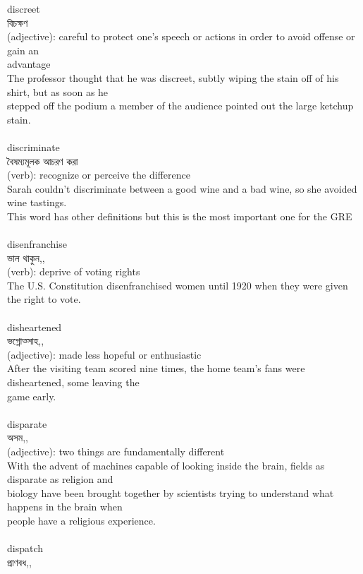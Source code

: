 \documentclass{article}
\begin{document}
{discreet}\\
{বিচক্ষণ}\\
{(adjective): careful to protect one's speech or actions in order to avoid offense or gain an\\advantage\\The professor thought that he was discreet, subtly wiping the stain off of his shirt, but as soon as he\\stepped off the podium a member of the audience pointed out the large ketchup stain.\\}\\
{discriminate}\\
{বৈষম্যমূলক আচরণ করা}\\
{(verb): recognize or perceive the difference\\Sarah couldn't discriminate between a good wine and a bad wine, so she avoided wine tastings.\\This word has other definitions but this is the most important one for the GRE\\}\\
{disenfranchise}\\
{ভাল থাকুন,,}\\
{(verb): deprive of voting rights\\The U.S. Constitution disenfranchised women until 1920 when they were given the right to vote.\\}\\
{disheartened}\\
{ভগ্নোত্সাহ,,}\\
{(adjective): made less hopeful or enthusiastic\\After the visiting team scored nine times, the home team's fans were disheartened, some leaving the\\game early.\\}\\
{disparate}\\
{অসম,,}\\
{(adjective): two things are fundamentally different\\With the advent of machines capable of looking inside the brain, fields as disparate as religion and\\biology have been brought together by scientists trying to understand what happens in the brain when\\people have a religious experience.\\}\\
{dispatch}\\
{প্রাণবধ,,}\\
\end{document}
